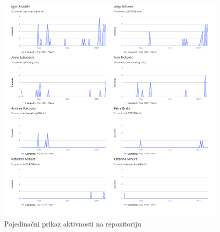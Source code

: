 		\begin{figure}[H]
			\includegraphics[scale=0.9]{slike/pojedinac.PNG} %
			\centering
			\caption{Pojedinačni prikaz aktivnosti na repozitoriju}
			\label{fig:pojedinac}
		\end{figure}
					
		
		